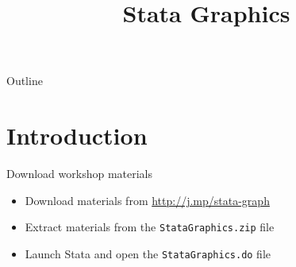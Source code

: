\documentclass[table,smaller]{beamer}
\institute{Harvard MIT Data Center}
\author{}
\date{}
\title{Stata Graphics}
\begin{document}
\maketitle
\begin{frame}{Outline}
\tableofcontents
\end{frame}


\section{Introduction}
\label{sec-1}

\begin{frame}[fragile,label=sec-1-1]{Download workshop materials}
 \begin{itemize}
\item Download materials from \url{http://j.mp/stata-graph}
\item Extract materials from the \texttt{StataGraphics.zip} file
\item Launch Stata and open the \texttt{StataGraphics.do} file
\end{itemize}
\end{frame}
\end{document}
